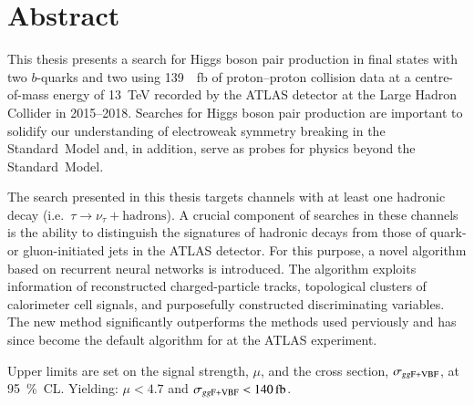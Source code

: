 \chapter*{Abstract}


This thesis presents a search for Higgs boson pair production in final states
with two $b$-quarks and two \tauleptons using \SI{139}{\per\femto\barn} of
proton--proton collision data at a centre-of-mass energy of \SI{13}{\TeV}
recorded by the ATLAS detector at the Large Hadron Collider in 2015--2018.
Searches for Higgs boson pair production are important to solidify our
understanding of electroweak symmetry breaking in the Standard~Model and, in
addition, serve as probes for physics beyond the Standard~Model.

The search presented in this thesis targets channels with at least one hadronic
\taulepton decay (i.e.~$\tau \to \nu_{\tau} + \text{hadrons}$). A crucial
component of searches in these channels is the ability to distinguish the
signatures of hadronic \taulepton decays from those of quark- or gluon-initiated
jets in the ATLAS detector. For this purpose, a novel \tauid algorithm based on
recurrent neural networks is introduced. The algorithm exploits information of
reconstructed charged-particle tracks, topological clusters of calorimeter cell
signals, and purposefully constructed discriminating variables. The new \tauid
method significantly outperforms the methods used perviously and has since
become the default algorithm for \tauid at the ATLAS experiment.

Upper limits are set on the signal strength, $\mu$, and the cross section,
$\sigma_{gg\text{F+VBF}}$, at \SI{95}{\percent}~CL. Yielding: $\mu < \num{4.7}$ and
$\xsecggfvbf < \SI{140}{\femto\barn}$.










%


%


